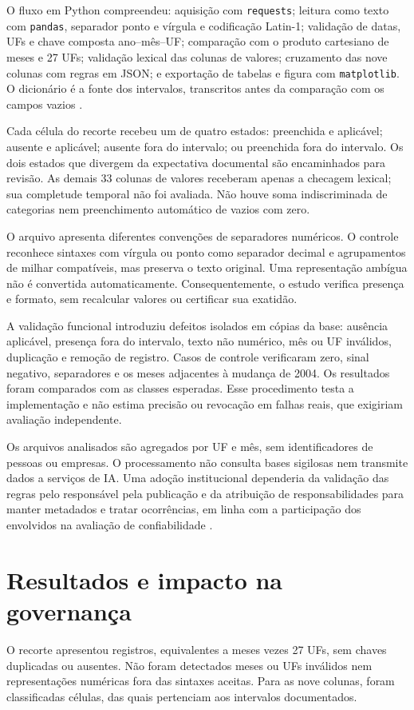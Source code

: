 \documentclass[12pt,a4paper]{article}
\begin{document}
O fluxo em Python compreendeu: aquisição com \texttt{requests}; leitura como
texto com \texttt{pandas}, separador ponto e vírgula e codificação Latin-1;
validação de datas, UFs e chave composta ano--mês--UF; comparação com o produto
cartesiano de meses e 27 UFs; validação lexical das colunas de valores;
cruzamento das nove colunas com regras em JSON; e exportação de tabelas e
figura com \texttt{matplotlib}. O dicionário é a fonte dos intervalos, transcritos
antes da comparação com os campos vazios \cite{rfbDicionario}.

Cada célula do recorte recebeu um de quatro estados: preenchida e aplicável;
ausente e aplicável; ausente fora do intervalo; ou preenchida fora do intervalo.
Os dois estados que divergem da expectativa documental são encaminhados para
revisão. As demais 33 colunas de valores receberam apenas a checagem lexical;
sua completude temporal não foi avaliada. Não houve soma indiscriminada de
categorias nem preenchimento automático de vazios com zero.

O arquivo apresenta diferentes convenções de separadores numéricos. O controle
reconhece sintaxes com vírgula ou ponto como separador decimal e agrupamentos
de milhar compatíveis, mas preserva o texto original. Uma representação
ambígua não é convertida automaticamente. Consequentemente, o estudo verifica
presença e formato, sem recalcular valores ou certificar sua exatidão.

A validação funcional introduziu defeitos isolados em cópias da base:
ausência aplicável, presença fora do intervalo, texto não numérico, mês ou UF
inválidos, duplicação e remoção de registro. Casos de controle verificaram
zero, sinal negativo, separadores e os meses adjacentes à mudança de 2004.
Os resultados foram comparados com as classes esperadas. Esse procedimento
testa a implementação e não estima precisão ou revocação em falhas reais,
que exigiriam avaliação independente.

Os arquivos analisados são agregados por UF e mês, sem identificadores de
pessoas ou empresas. O processamento não consulta bases sigilosas nem transmite
dados a serviços de IA. Uma adoção institucional dependeria da validação das
regras pelo responsável pela publicação e da atribuição de responsabilidades
para manter metadados e tratar ocorrências, em linha com a participação dos
envolvidos na avaliação de confiabilidade \cite{gao2019}.

\section{Resultados e impacto na governança}
O recorte apresentou \NRegistros{} registros, equivalentes a \NMeses{} meses
vezes 27 UFs, sem chaves duplicadas ou ausentes. Não foram detectados meses ou
UFs inválidos nem representações numéricas fora das sintaxes aceitas. Para as
nove colunas, foram classificadas \NCelulas{} células, das quais
\NAplicaveis{} pertenciam aos intervalos documentados.
\end{document}
